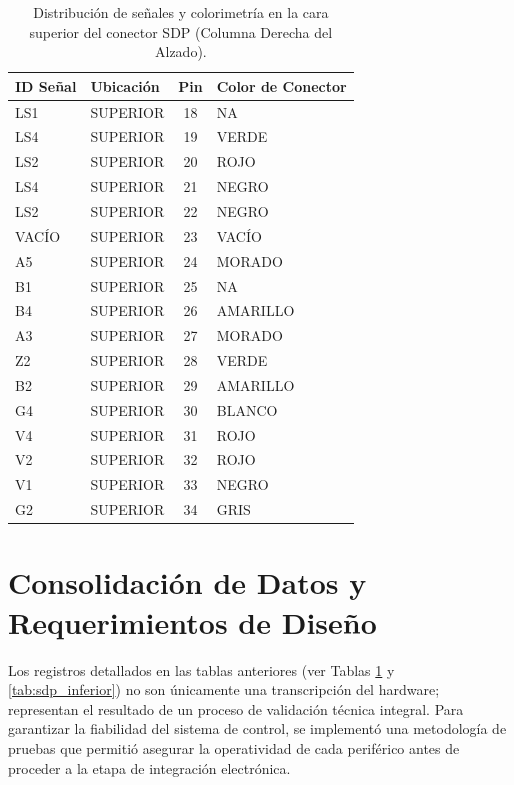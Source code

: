 \begin{table}[h]
	\centering
	\caption[Mapeo SDP: Cara Superior]{Distribución de señales y colorimetría en la cara superior del conector SDP (Columna Derecha del Alzado).}
	\label{tab:sdp_superior}
	\renewcommand{\arraystretch}{1.5}
	\begin{tabular}{llcl}
		\toprule
		\textbf{ID Señal} & \textbf{Ubicación} & \textbf{Pin} & \textbf{Color de Conector} \\
		\midrule
		LS1   & SUPERIOR & 18 & NA \\
		LS4   & SUPERIOR & 19 & VERDE \\
		LS2   & SUPERIOR & 20 & ROJO \\
		LS4   & SUPERIOR & 21 & NEGRO \\
		LS2   & SUPERIOR & 22 & NEGRO \\
		VACÍO & SUPERIOR & 23 & VACÍO \\
		A5    & SUPERIOR & 24 & MORADO \\
		B1    & SUPERIOR & 25 & NA \\ %
		B4    & SUPERIOR & 26 & AMARILLO \\
		A3    & SUPERIOR & 27 & MORADO \\ %
		Z2    & SUPERIOR & 28 & VERDE \\
		B2    & SUPERIOR & 29 & AMARILLO \\
		G4    & SUPERIOR & 30 & BLANCO \\
		V4    & SUPERIOR & 31 & ROJO \\
		V2    & SUPERIOR & 32 & ROJO \\
		V1    & SUPERIOR & 33 & NEGRO \\
		G2    & SUPERIOR & 34 & GRIS \\ %
		\bottomrule
	\end{tabular}
\end{table}
	\clearpage
	\section{Consolidación de Datos y Requerimientos de Diseño}
	
	Los registros detallados en las tablas anteriores (ver Tablas \ref{tab:sdp_superior} y \ref{tab:sdp_inferior}) no son únicamente una transcripción del hardware; representan el resultado de un proceso de validación técnica integral. Para garantizar la fiabilidad del sistema de control, se implementó una metodología de pruebas que permitió asegurar la operatividad de cada periférico antes de proceder a la etapa de integración electrónica.
	
